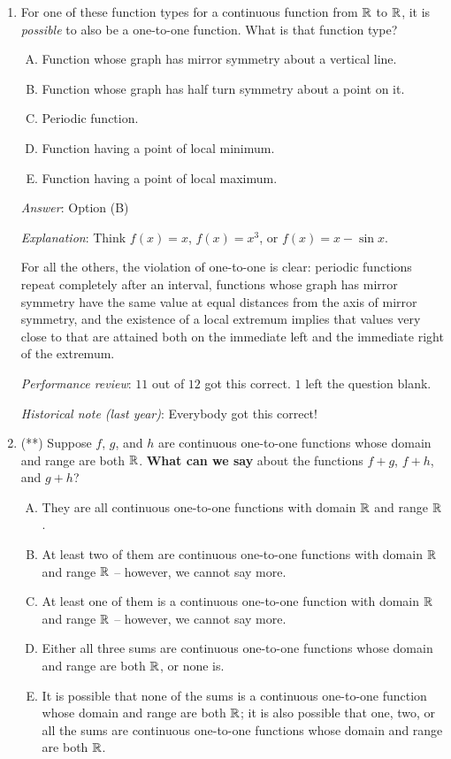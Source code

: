 \documentclass[10pt]{amsart}
\begin{document}
\begin{enumerate}
\item For one of these function types for a continuous function from
  $\mathbb{R}$ to $\mathbb{R}$, it is {\em possible} to also be a one-to-one
  function. What is that function type?

  \begin{enumerate}[(A)]
  \item Function whose graph has mirror symmetry about a vertical line.
  \item Function whose graph has half turn symmetry about a point on it.
  \item Periodic function.
  \item Function having a point of local minimum.
  \item Function having a point of local maximum.
  \end{enumerate}

  {\em Answer}: Option (B)

  {\em Explanation}: Think $f(x) = x$, $f(x) = x^3$, or $f(x) = x -
  \sin x$.

  For all the others, the violation of one-to-one is clear: periodic
  functions repeat completely after an interval, functions whose graph
  has mirror symmetry have the same value at equal distances from the
  axis of mirror symmetry, and the existence of a local extremum
  implies that values very close to that are attained both on the
  immediate left and the immediate right of the extremum.

  {\em Performance review}: $11$ out of $12$ got this correct. $1$
  left the question blank.

  {\em Historical note (last year)}: Everybody got this correct!

\item (**) Suppose $f$, $g$, and $h$ are continuous one-to-one
  functions whose domain and range are both $\mathbb{R}$. {\bf What can we
    say} about the functions $f + g$, $f + h$, and $g + h$?

  \begin{enumerate}[(A)]
  \item They are all continuous one-to-one functions with domain $\mathbb{R}$
    and range $\mathbb{R}$.
  \item At least two of them are continuous one-to-one functions with
    domain $\mathbb{R}$ and range $\mathbb{R}$ -- however, we cannot say more.
  \item At least one of them is a continuous one-to-one function with
    domain $\mathbb{R}$ and range $\mathbb{R}$ -- however, we cannot say more.
  \item Either all three sums are continuous one-to-one functions
    whose domain and range are both $\mathbb{R}$, or none is.
  \item It is possible that none of the sums is a continuous
    one-to-one function whose domain and range are both $\mathbb{R}$; it is
    also possible that one, two, or all the sums are continuous
    one-to-one functions whose domain and range are both $\mathbb{R}$.
  \end{enumerate}


\end{enumerate}
\end{document}

